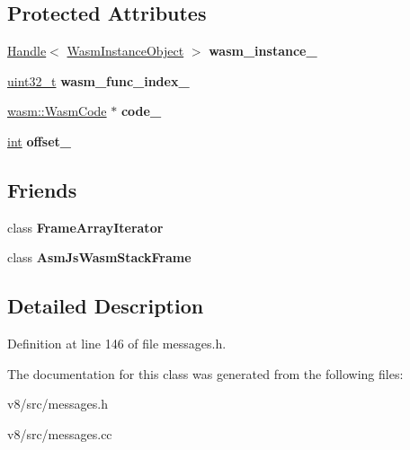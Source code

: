 \subsection*{Protected Attributes}
\begin{DoxyCompactItemize}
\item 
\mbox{\label{classv8_1_1internal_1_1WasmStackFrame_a5802ec84dcdd58ed2aeccbc08f7e6a5e}} 
\mbox{\hyperlink{classv8_1_1internal_1_1Handle}{Handle}}$<$ \mbox{\hyperlink{classv8_1_1internal_1_1WasmInstanceObject}{Wasm\+Instance\+Object}} $>$ {\bfseries wasm\+\_\+instance\+\_\+}
\item 
\mbox{\label{classv8_1_1internal_1_1WasmStackFrame_a66f8a0092f862f18e5ab46b525e8ebc0}} 
\mbox{\hyperlink{classuint32__t}{uint32\+\_\+t}} {\bfseries wasm\+\_\+func\+\_\+index\+\_\+}
\item 
\mbox{\label{classv8_1_1internal_1_1WasmStackFrame_ac9522a7b531ac5c7653f958cbbca1cfa}} 
\mbox{\hyperlink{classv8_1_1internal_1_1wasm_1_1WasmCode}{wasm\+::\+Wasm\+Code}} $\ast$ {\bfseries code\+\_\+}
\item 
\mbox{\label{classv8_1_1internal_1_1WasmStackFrame_a4fd4f193f97b92c2826018e566dcbd95}} 
\mbox{\hyperlink{classint}{int}} {\bfseries offset\+\_\+}
\end{DoxyCompactItemize}
\subsection*{Friends}
\begin{DoxyCompactItemize}
\item 
\mbox{\label{classv8_1_1internal_1_1WasmStackFrame_af3c3172bd938659024c2add527940535}} 
class {\bfseries Frame\+Array\+Iterator}
\item 
\mbox{\label{classv8_1_1internal_1_1WasmStackFrame_a0263d945fb7363d5e6be30118990fc03}} 
class {\bfseries Asm\+Js\+Wasm\+Stack\+Frame}
\end{DoxyCompactItemize}


\subsection{Detailed Description}


Definition at line 146 of file messages.\+h.



The documentation for this class was generated from the following files\+:\begin{DoxyCompactItemize}
\item 
v8/src/messages.\+h\item 
v8/src/messages.\+cc\end{DoxyCompactItemize}

